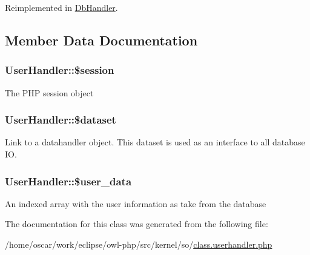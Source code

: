 Reimplemented in \hyperlink{classDbHandler_9982df4830f05803935bb31bac7fae3d}{DbHandler}.

\subsection{Member Data Documentation}
\hypertarget{classUserHandler_f097b7fd1ee085b46a6c34e071508a7f}{
\subsubsection{\setlength{\rightskip}{0pt plus 5cm}UserHandler::\$session}}
\label{classUserHandler_f097b7fd1ee085b46a6c34e071508a7f}


The PHP session object \hypertarget{classUserHandler_c38c1ea50b2820ed03781bdbe8eb2e08}{
\subsubsection{\setlength{\rightskip}{0pt plus 5cm}UserHandler::\$dataset}}
\label{classUserHandler_c38c1ea50b2820ed03781bdbe8eb2e08}


Link to a datahandler object. This dataset is used as an interface to all database IO. \hypertarget{classUserHandler_e7a2d59eee65560ac96b860e828bb445}{
\subsubsection{\setlength{\rightskip}{0pt plus 5cm}UserHandler::\$user\_\-data}}
\label{classUserHandler_e7a2d59eee65560ac96b860e828bb445}


An indexed array with the user information as take from the database 

The documentation for this class was generated from the following file:\begin{CompactItemize}
\item 
/home/oscar/work/eclipse/owl-php/src/kernel/so/\hyperlink{class_8userhandler_8php}{class.userhandler.php}\end{CompactItemize}
